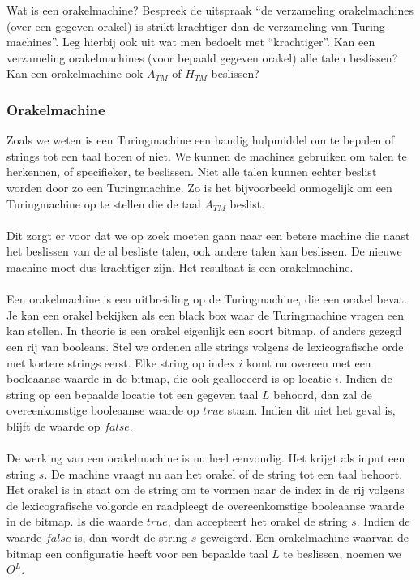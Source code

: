 \begin{question}
	Wat is een orakelmachine? Bespreek de uitspraak ``de verzameling orakelmachines (over een gegeven orakel) is strikt krachtiger dan de verzameling van Turing machines''. Leg hierbij ook uit wat men bedoelt met ``krachtiger''. Kan een verzameling orakelmachines (voor bepaald gegeven orakel) alle talen beslissen? Kan een orakelmachine ook $A_{TM}$ of $H_{TM}$ beslissen?
\end{question}

\subsubsection*{Orakelmachine}

Zoals we weten is een Turingmachine een handig hulpmiddel om te bepalen of strings tot een taal horen of niet. We kunnen de machines gebruiken om talen te herkennen, of specifieker, te beslissen. Niet alle talen kunnen echter beslist worden door zo een Turingmachine. Zo is het bijvoorbeeld onmogelijk om een Turingmachine op te stellen die de taal $A_{TM}$ beslist.
\\\\
Dit zorgt er voor dat we op zoek moeten gaan naar een betere machine die naast het beslissen van de al besliste talen, ook andere talen kan beslissen. De nieuwe machine moet dus krachtiger zijn. Het resultaat is een orakelmachine.
\\\\
Een orakelmachine is een uitbreiding op de Turingmachine, die een orakel bevat. Je kan een orakel bekijken als een black box waar de Turingmachine vragen een kan stellen. In theorie is een orakel eigenlijk een soort bitmap, of anders gezegd een rij van booleans. Stel we ordenen alle strings volgens de lexicografische orde met kortere strings eerst. Elke string op index $i$ komt nu overeen met een booleaanse waarde in de bitmap, die ook gealloceerd is op locatie $i$. Indien de string op een bepaalde locatie tot een gegeven taal $L$ behoord, dan zal de overeenkomstige booleaanse waarde op $true$ staan. Indien dit niet het geval is, blijft de waarde op $false$.
\\\\
De werking van een orakelmachine is nu heel eenvoudig. Het krijgt als input een string $s$. De machine vraagt nu aan het orakel of de string tot een taal behoort. Het orakel is in staat om de string om te vormen naar de index in de rij volgens de lexicografische volgorde en raadpleegt de overeenkomstige booleaanse waarde in de bitmap. Is die waarde $true$, dan accepteert het orakel de string $s$. Indien de waarde $false$ is, dan wordt de string $s$ geweigerd. Een orakelmachine waarvan de bitmap een configuratie heeft voor een bepaalde taal $L$ te beslissen, noemen we $O^L$.

